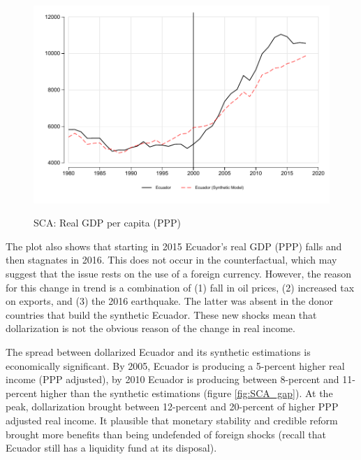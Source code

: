 \documentclass[12pt]{article}
\begin{document}
\begin{figure}[!htbp]
    \caption{SCA: Real GDP per capita (PPP)}
    \centering
    \includegraphics{STATA/Fig_GDP_SCA.pdf}
    \label{fig:SCA_GDP}
\end{figure}

The plot also shows that starting in 2015 Ecuador's real GDP (PPP) falls and then stagnates in 2016. This does not occur in the counterfactual, which may suggest that the issue rests on the use of a foreign currency. However, the reason for this change in trend is a combination of (1) fall in oil prices, (2) increased tax on exports, and (3) the 2016 earthquake. The latter was absent in the donor countries that build the synthetic Ecuador. These new shocks mean that dollarization is not the obvious reason of the change in real income. 

The spread between dollarized Ecuador and its synthetic estimations is economically significant. By 2005, Ecuador is producing a 5-percent higher real income (PPP adjusted), by 2010 Ecuador is producing between 8-percent and 11-percent higher than the synthetic estimations (figure \ref{fig:SCA_gap}). At the peak, dollarization brought between 12-percent and 20-percent of higher PPP adjusted real income. It plausible that monetary stability and credible reform brought more benefits than being undefended of foreign shocks (recall that Ecuador still has a liquidity fund at its disposal).
\end{document}
